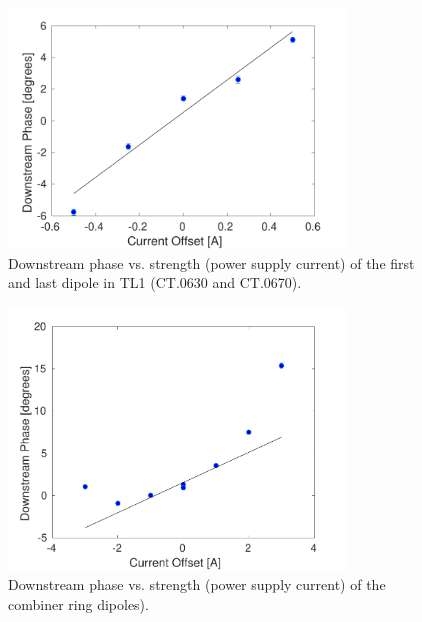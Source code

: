 
\begin{figure}
  \centering
  \includegraphics[width=0.8\textwidth]{Figures/propagation/tl1670}
  \caption{Downstream phase vs. strength (power supply current) of the first and last dipole in TL1 (CT.0630 and CT.0670).}
  \label{f:tl1670}
\end{figure}


\begin{figure}
  \centering
  \includegraphics[width=0.8\textwidth]{Figures/propagation/crBends}
  \caption{Downstream phase vs. strength (power supply current) of the combiner ring dipoles).}
  \label{f:crBends}
\end{figure}

